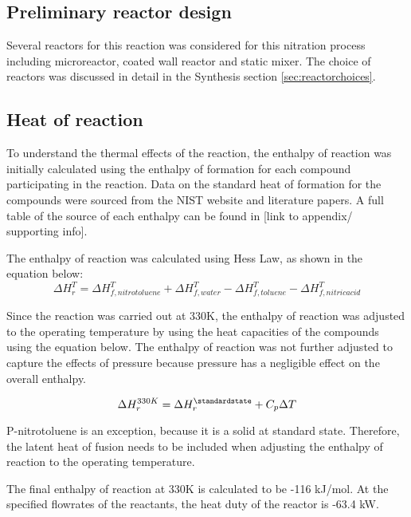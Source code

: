\subsection{Preliminary reactor design}
Several reactors for this reaction was considered for this nitration process including microreactor, coated wall reactor and static mixer. The choice of reactors was discussed in detail in the Synthesis section \ref{sec:reactorchoices}.

\subsection{Heat of reaction}
To understand the thermal effects of the reaction, the enthalpy of reaction was initially calculated using the enthalpy of formation for each compound participating in the reaction. Data on the standard heat of formation for the compounds were sourced from the NIST website and literature papers. A full table of the source of each enthalpy can be found in [link to appendix/ supporting info]. 

The enthalpy of reaction was calculated using Hess Law, as shown in the equation below:
\begin{equation}
  \Delta H_{r}^{T} = \Delta H_{f,nitrotoluene}^{T} + \Delta H_{f,water}^{T} - \Delta H_{f,toluene}^{T} - \Delta H_{f,nitric acid}^{T}
\end{equation}

Since the reaction was carried out at 330K, the enthalpy of reaction was adjusted to the operating temperature by using the heat capacities of the compounds using the equation below. The enthalpy of reaction was not further adjusted to capture the effects of pressure because pressure has a negligible effect on the overall enthalpy. 

\begin{equation}
  \Delta H_{r}^{330K} = \Delta H_{r}^{\standardstate} + C_p \Delta T
\end{equation}

P-nitrotoluene is an exception, because it is a solid at standard state. Therefore, the latent heat of fusion needs to be included when adjusting the enthalpy of reaction to the operating temperature. 

The final enthalpy of reaction at 330K is calculated to be -116 kJ/mol. At the specified flowrates of the reactants, the heat duty of the reactor is -63.4 kW.


